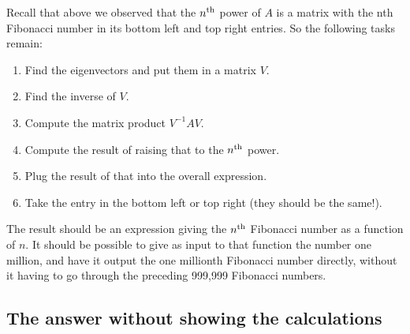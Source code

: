 Recall that above we observed that the $n^{\text{th}}$ power of $A$ is a matrix with the
nth Fibonacci number in its bottom left and top right entries. So the following
tasks remain:
\begin{enumerate}
\item Find the eigenvectors and put them in a matrix $V$.
\item Find the inverse of $V$.
\item Compute the matrix product $V^{-1}AV$.
\item Compute the result of raising that to the $n^{\text{th}}$ power.
\item Plug the result of that into the overall expression.
\item Take the entry in the bottom left or top right (they should be the same!).
\end{enumerate}

The result should be an expression giving the $n^{\text{th}}$ Fibonacci number as a
function of $n$. It should be possible to give as input to that function the
number one million, and have it output the one millionth Fibonacci number
directly, without it having to go through the preceding 999,999 Fibonacci
numbers.


\subsection*{The answer without showing the calculations}

